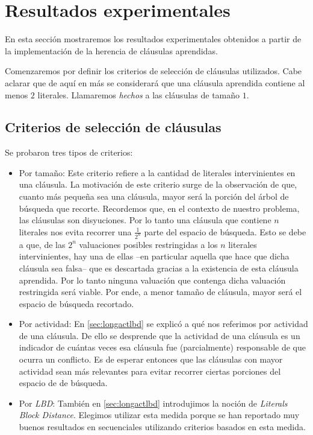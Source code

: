 \section{Resultados experimentales}

En esta sección mostraremos los resultados experimentales obtenidos a partir
de la implementación de la herencia de cláusulas aprendidas.

Comenzaremos por definir los criterios de selección de cláusulas utilizados.
Cabe aclarar que de aquí en más se considerará que una cláusula aprendida
contiene al menos $2$ literales. Llamaremos \emph{hechos} a las cláusulas de
tamaño $1$.

\subsection{Criterios de selección de cláusulas}

Se probaron tres tipos de criterios:

\begin{itemize}
	\item Por tamaño: Este criterio refiere a la cantidad de literales intervinientes en una cláusula. La motivación de este criterio surge de la observación de que, cuanto más pequeña sea una cláusula, mayor será la porción del árbol de búsqueda que recorte. Recordemos que, en el contexto de nuestro problema, las cláusulas son disyuciones. Por lo tanto una cláusula que contiene $n$ literales nos evita recorrer una $\frac{1}{2^n}$ parte del espacio de búsqueda. Esto se debe a que, de las $2^n$ valuaciones posibles restringidas a los $n$ literales intervinientes, hay una de ellas --en particular aquella que hace que dicha cláusula sea falsa-- que es descartada gracias a la existencia de esta cláusula aprendida. Por lo tanto ninguna valuación que contenga dicha valuación restringida será viable. Por ende, a menor tamaño de cláusula, mayor será el espacio de búsqueda recortado.

	\item Por actividad: En \ref{sec:longactlbd} se explicó a qué nos referimos por actividad de una cláusula. De ello se desprende que la actividad de una cláusula es un indicador de cuántas veces esa cláusula fue (parcialmente) responsable de que ocurra un conflicto. Es de esperar entonces que las cláusulas con mayor actividad sean más relevantes para evitar recorrer ciertas porciones del espacio de de búsqueda.

	\item Por \emph{LBD}: También en \ref{sec:longactlbd} introdujimos la noción de \emph{Literals Block Distance}. Elegimos utilizar esta medida porque se han reportado muy buenos resultados en \ssolvers secuenciales \cite{satchallenge12,satcomp11,satcomp09} utilizando criterios basados en esta medida.
\end{itemize}


